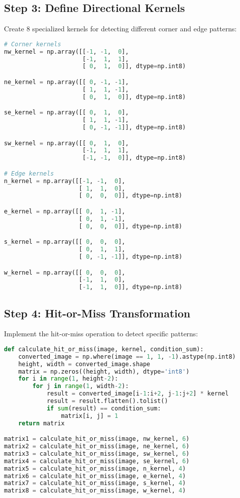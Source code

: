 \documentclass[12pt]{article}
\begin{document}
\subsection{Step 3: Define Directional Kernels}
Create 8 specialized kernels for detecting different corner and edge patterns:

\begin{lstlisting}[language=Python]
# Corner kernels
nw_kernel = np.array([[-1, -1,  0],
                      [-1,  1,  1],
                      [ 0,  1,  0]], dtype=np.int8)

ne_kernel = np.array([[ 0, -1, -1],
                      [ 1,  1, -1],
                      [ 0,  1,  0]], dtype=np.int8)

se_kernel = np.array([[ 0,  1,  0],
                      [ 1,  1, -1],
                      [ 0, -1, -1]], dtype=np.int8)

sw_kernel = np.array([[ 0,  1,  0],
                      [-1,  1,  1],
                      [-1, -1,  0]], dtype=np.int8)

# Edge kernels
n_kernel = np.array([[-1, -1,  0],
                     [ 1,  1,  0],
                     [ 0,  0,  0]], dtype=np.int8)

e_kernel = np.array([[ 0,  1, -1],
                     [ 0,  1, -1],
                     [ 0,  0,  0]], dtype=np.int8)

s_kernel = np.array([[ 0,  0,  0],
                     [ 0,  1,  1],
                     [ 0, -1, -1]], dtype=np.int8)

w_kernel = np.array([[ 0,  0,  0],
                     [-1,  1,  0],
                     [-1,  1,  0]], dtype=np.int8)
\end{lstlisting}

\subsection{Step 4: Hit-or-Miss Transformation}
Implement the hit-or-miss operation to detect specific patterns:

\begin{lstlisting}[language=Python]
def calculate_hit_or_miss(image, kernel, condition_sum):
    converted_image = np.where(image == 1, 1, -1).astype(np.int8)
    height, width = converted_image.shape
    matrix = np.zeros((height, width), dtype='int8')
    for i in range(1, height-2):
        for j in range(1, width-2):
            result = converted_image[i-1:i+2, j-1:j+2] * kernel
            result = result.flatten().tolist()
            if sum(result) == condition_sum:
                matrix[i, j] = 1
    return matrix

matrix1 = calculate_hit_or_miss(image, nw_kernel, 6)
matrix2 = calculate_hit_or_miss(image, ne_kernel, 6)
matrix3 = calculate_hit_or_miss(image, sw_kernel, 6)
matrix4 = calculate_hit_or_miss(image, se_kernel, 6)
matrix5 = calculate_hit_or_miss(image, n_kernel, 4)
matrix6 = calculate_hit_or_miss(image, e_kernel, 4)
matrix7 = calculate_hit_or_miss(image, s_kernel, 4)
matrix8 = calculate_hit_or_miss(image, w_kernel, 4)
\end{lstlisting}
\end{document}

